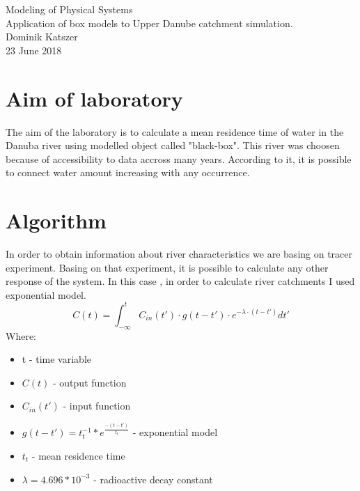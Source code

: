 \documentclass[a4paper,12pt]{article}
\begin{document}
\begin{titlepage}
\center
\vspace*{\fill}
\Huge{Modeling of Physical Systems}\\
\Large{Application of box models to Upper
Danube catchment simulation.}\\
\vspace*{1.5cm}
Dominik Katszer\\
\large{23 June 2018}
\vspace*{1.5cm}
\vspace*{\fill}
\end{titlepage}
\section{Aim of laboratory}
The aim of the laboratory is to calculate a mean residence time of water in the  Danuba river using modelled object called "black-box". This river was choosen because of accessibility to data accross many years. According to it, it is possible to connect water amount
increasing with any occurrence.
\section{Algorithm}
In order to obtain information about river characteristics we are basing on tracer experiment. Basing on that experiment, it is possible to calculate any other response of the system. In this case , in order to calculate  river catchments I used exponential model.
\begin{equation}
	C(t) = \int_{- \infty}^{t} C_{in}(t') \cdot g(t - t') \cdot e^{-\lambda \cdot (t - t')} dt'
\end{equation}
Where:
\begin{itemize}
    \item t - time variable
	\item $C(t)$ - output function
    \item $C_{in}(t')$ - input function
    \item $g(t - t') = t_t^{-1}*e^{\frac{-(t-t')}{t_t}}$ - exponential model
    \item $t_t$ - mean residence time
    \item $\lambda = 4.696 * 10^{-3}$ - radioactive decay constant
\end{itemize}
\end{document}

